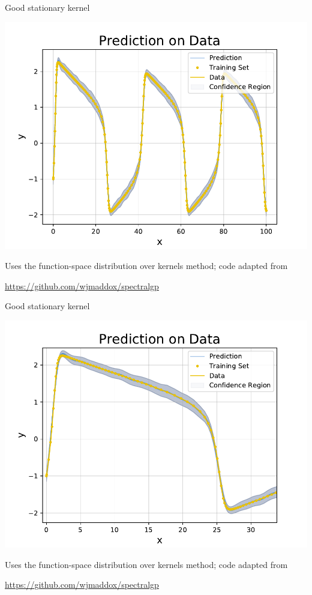 \documentclass[presentation]{beamer}
\begin{document}
\begin{frame}[plain,label={sec:org0fb446c}]{Good stationary kernel}
\begin{center}
\includegraphics[width=.8\textwidth]{./fkl_1.pdf}
\end{center}

Uses the function-space distribution over kernels method; code adapted from

\url{https://github.com/wjmaddox/spectralgp}
\end{frame}

\begin{frame}[plain,label={sec:org5bc94a7}]{Good stationary kernel}
\begin{center}
\includegraphics[width=.8\textwidth]{./fkl_2.pdf}
\end{center}

Uses the function-space distribution over kernels method; code adapted from

\url{https://github.com/wjmaddox/spectralgp}
\end{frame}
\end{document}
